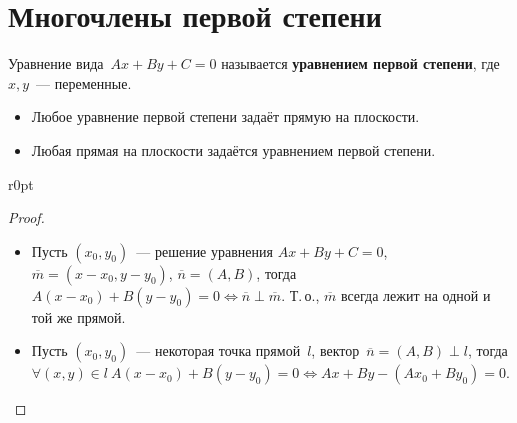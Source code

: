 \section{Многочлены первой степени}
Уравнение вида~$Ax + By + C = 0$ называется \textbf{уравнением первой степени}, где $x, y$~--- переменные.

\begin{theorem}
\begin{itemize}
	\item Любое уравнение первой степени задаёт прямую на плоскости.
	\item Любая прямая на плоскости задаётся уравнением первой степени.
\end{itemize}
\end{theorem}

\begin{wrapfigure}[3]{r}{0pt}\noindent
{}
\end{wrapfigure}

\begin{proof}
\begin{itemize}
	\item Пусть $(x_0, y_0)$~--- решение уравнения $Ax + By + C = 0$, $\overline m = (x - x_0, y - y_0)$, $\overline n = (A, B)$, тогда $A(x - x_0) + B(y - y_0) = 0 \Leftrightarrow \overline n \perp \overline m$.
	Т.\,о., $\overline m$ всегда лежит на одной и той же прямой.
	
	\item Пусть $(x_0, y_0)$~--- некоторая точка прямой~$l$, вектор~$\overline n = (A, B) \perp l$, тогда $\forall (x, y) \in l \ \allowbreak A(x - x_0) + B(y - y_0) = 0 \Leftrightarrow Ax + By - (Ax_0 + By_0) = 0$.
\end{itemize}
\end{proof}

